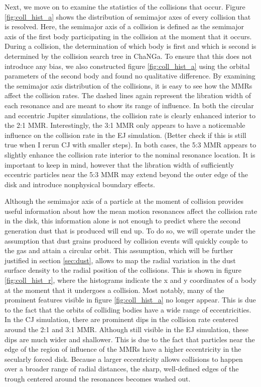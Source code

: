 \documentclass[twocolumn]{aastex63}
\begin{document}
Next, we move on to examine the statistics of the collisions that occur. Figure \ref{fig:coll_hist_a} shows the distribution of semimajor axes of every collision that is resolved. Here, the semimajor axis of a collision is defined as the semimajor axis of the first body participating in the collision at the moment that it occurs. During a collision, the determination of which body is first and which is second is determined by the collision search tree in {\sc ChaNGa}. To ensure that this does not introduce any bias, we also constructed figure \ref{fig:coll_hist_a} using the orbital parameters of the second body and found no qualitative difference. By examining the semimajor axis distribution of the collisions, it is easy to see how the MMRs affect the collision rates. The dashed lines again represent the libration width of each resonance and are meant to show its range of influence. In both the circular and eccentric Jupiter simulations, the collision rate is clearly enhanced interior to the 2:1 MMR. Interestingly, the 3:1 MMR only appears to have a noticemable influence on the collision rate in the EJ simulation. (Better check if this is still true when I rerun CJ with smaller steps). In both cases, the 5:3 MMR appears to slightly enhance the collision rate interior to the nominal resonance location. It is important to keep in mind, however that the libration width of sufficiently eccentric particles near the 5:3 MMR may extend beyond the outer edge of the disk and introduce nonphysical boundary effects.

Although the semimajor axis of a particle at the moment of collision provides useful information about how the mean motion resonances affect the collision rate in the disk, this information alone is not enough to predict where the second generation dust that is produced will end up. To do so, we will operate under the assumption that dust grains produced by collision events will quickly couple to the gas and attain a circular orbit. This assumption, which will be further justified in section \ref{sec:dust}, allows to map the radial variation in the dust surface density to the radial position of the collisions. This is shown in figure \ref{fig:coll_hist_r}, where the histograms indicate the x and y coordinates of a body at the moment that it undergoes a collision. Most notably, many of the prominent features visible in figure \ref{fig:coll_hist_a} no longer appear. This is due to the fact that the orbits of colliding bodies have a wide range of eccentricities. In the CJ simulation, there are prominent dips in the collision rate centered around the 2:1 and 3:1 MMR. Although still visible in the EJ simulation, these dips are much wider and shallower. This is due to the fact that particles near the edge of the region of influence of the MMRs have a higher eccentricity in the secularly forced disk. Because a larger eccentricity allows collisions to happen over a broader range of radial distances, the sharp, well-defined edges of the trough centered around the resonances becomes washed out.
\end{document}
